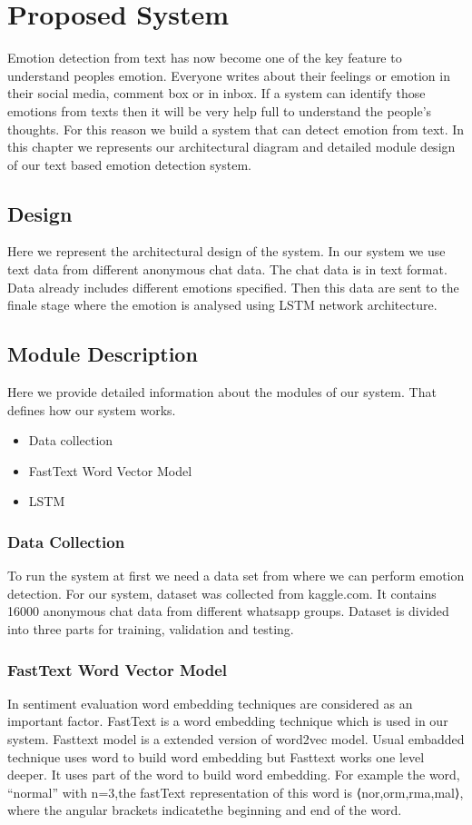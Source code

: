 \chapter{Proposed System}
\label{ch:Proposed System}
Emotion detection from text has now become one of the key feature to understand peoples emotion. Everyone writes about their feelings or emotion in their social media, comment box or in inbox. If a system can identify those emotions from texts then it will be very help full to understand the people's thoughts. For this reason we build a system that can detect emotion from text. In this chapter we represents our architectural diagram and detailed module design of our text based emotion detection system.

\section{Design}
Here we represent the architectural design of the system. In our system we use text data from different anonymous chat data. The chat data is in text format. Data already includes different emotions specified. Then this data are sent to the finale stage where the emotion is analysed using LSTM network architecture.


\section{Module Description}
Here we provide detailed information about the modules of our system. That defines how our system works.
\begin{itemize}
\item Data collection
\item FastText Word Vector Model
\item LSTM
\end{itemize}

\subsection{Data Collection}
To run the system at first we need a data set from where we can perform emotion detection. For our system, dataset was collected from kaggle.com. It contains 16000 anonymous chat data from different whatsapp groups. Dataset is divided into three parts for training, validation and testing.


\subsection{FastText Word Vector Model}
In sentiment evaluation word embedding techniques are considered as an important factor. FastText is a word embedding technique which is used in our system. Fasttext model is a extended version of word2vec model. Usual embadded technique uses word to build word embedding but Fasttext works one level deeper. It uses part of the word to build word embedding. For example the word, “normal” with n=3,the fastText representation of this word is ⟨nor,orm,rma,mal⟩, where the angular brackets indicatethe beginning and end of the word.

